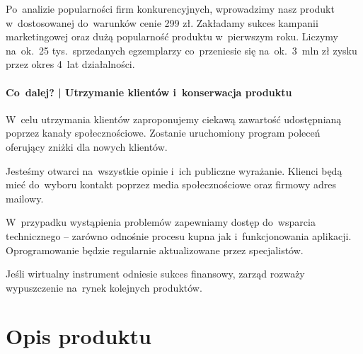 \documentclass[12pt]{article}
\newcommand{\productpricezl}{299 zł\xspace}
\begin{document}
Po~analizie popularności firm konkurencyjnych, wprowadzimy nasz produkt w~dostosowanej do~warunków cenie \productpricezl.
Zakładamy sukces kampanii marketingowej oraz dużą popularność produktu w~pierwszym roku.
Liczymy na~ok.~25 tys.~sprzedanych egzemplarzy co~przeniesie się na~ok.~3~mln zł zysku przez okres 4~lat działalności.

\paragraph{Co~dalej? | Utrzymanie klientów i~konserwacja produktu}

W~celu utrzymania klientów zaproponujemy ciekawą zawartość udostępnianą poprzez kanały społecznościowe.
Zostanie uruchomiony program poleceń oferujący zniżki dla nowych klientów.

Jesteśmy otwarci na~wszystkie opinie i~ich publiczne wyrażanie.
Klienci będą mieć do~wyboru kontakt poprzez media społecznościowe oraz firmowy adres mailowy.

W~przypadku wystąpienia problemów zapewniamy dostęp do~wsparcia technicznego -- zarówno odnośnie procesu kupna jak i~funkcjonowania aplikacji.
Oprogramowanie będzie regularnie aktualizowane przez specjalistów.

Jeśli wirtualny instrument odniesie sukces finansowy, zarząd rozważy wypuszczenie na~rynek kolejnych produktów.

\section{Opis produktu}



\end{document}
